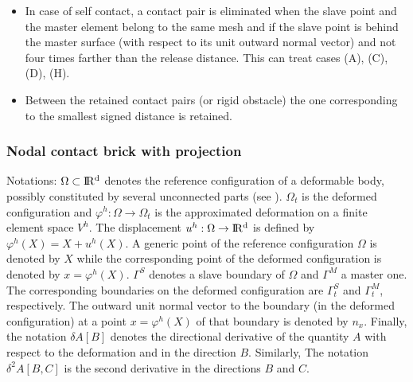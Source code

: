 \documentclass[a4paper,11pt,english]{sphinxmanual}
\begin{document}
\begin{itemize}
\item {} 
In case of self contact, a contact pair is eliminated when the slave point
and the master element belong to the same mesh and if the slave point is
behind the master surface (with respect to its unit outward normal vector)
and not four times farther than the release distance.
This can treat cases (A), (C), (D), (H).

\item {} 
Between the retained contact pairs (or rigid obstacle) the one
corresponding to the smallest signed distance is retained.

\end{itemize}


\subsubsection{Nodal contact brick with projection}
\label{\detokenize{userdoc/model_contact_friction_large_sliding:nodal-contact-brick-with-projection}}
Notations: \(\Omega \subset \rm I\hspace{-0.15em}R^d\) denotes the reference configuration of a deformable body, possibly constituted by several unconnected parts (see  {\hyperref[\detokenize{userdoc/model_contact_friction_large_sliding:ud-fig-masterslave}]{}}). \(\Omega_t\) is the deformed configuration and \(\varphi^h: \Omega \rightarrow \Omega_t\) is the approximated deformation on a finite element space \(V^h\). The displacement  \(u^h: \Omega \rightarrow \rm I\hspace{-0.15em}R^d\) is defined by \(\varphi^h(X) = X + u^h(X)\). A generic point of the reference configuration \(\Omega\) is denoted by \(X\) while the corresponding point of the deformed configuration is denoted by \(x = \varphi^h(X)\). \(\Gamma^S\) denotes a slave boundary of \(\Omega\) and \(\Gamma^M\) a master one. The corresponding boundaries on the deformed configuration are \(\Gamma_t^S\) and \(\Gamma_t^M\), respectively. The outward unit normal vector to the boundary (in the deformed configuration) at a point \(x = \varphi^h(X)\) of that boundary is denoted by \(n_x\). Finally, the notation \(\delta A[B]\) denotes the directional derivative of the quantity \(A\) with respect to the deformation and in the direction \(B\). Similarly, The notation \(\delta^2 A[B,C]\) is the second derivative in the directions  \(B\) and \(C\).
\end{document}
